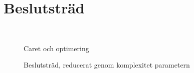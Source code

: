 \documentclass[swedish, english, 11pt ]{article}
\numberwithin{equation}{section}
\begin{document}
\section{Beslutsträd}

\begin{figure}[ht]
\centering
\caption{Caret och optimering}
\\
\label{fig:imp}
\end{figure}


\begin{landscape}
\thispagestyle{empty}
\begin{figure}
\caption{Beslutsträd, reducerat genom komplexitet parametern}
 \centering
  \label{fig:tree1}
\end{figure}
\end{landscape}
\end{document}
